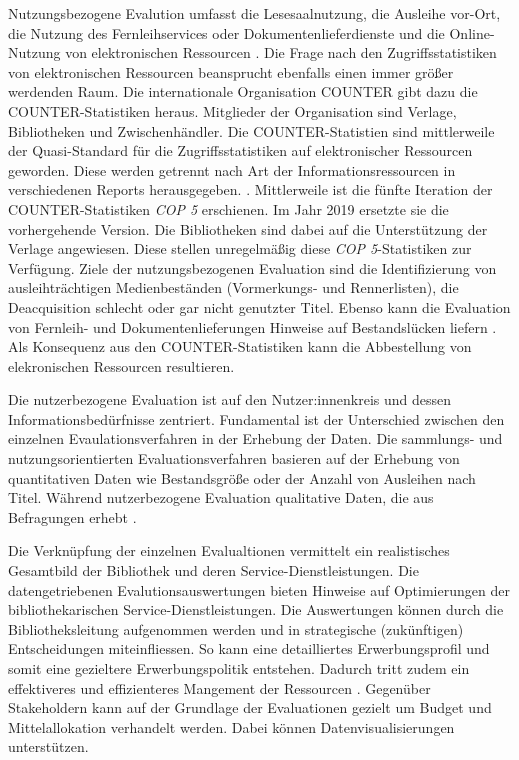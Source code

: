 Nutzungsbezogene Evalution umfasst die Lesesaalnutzung, die Ausleihe vor-Ort, die Nutzung des Fernleihservices oder Dokumentenlieferdienste und die Online-Nutzung von elektronischen Ressourcen \cite[vgl.][254 ff.]{johannsen_jochen_bestands-_2015}.
Die Frage nach den Zugriffsstatistiken von elektronischen Ressourcen beansprucht ebenfalls einen immer größer werdenden Raum.
Die internationale Organisation \acrfull{COUNTER} gibt dazu die COUNTER-Statistiken heraus. Mitglieder der Organisation sind Verlage, Bibliotheken
und Zwischenhändler. Die COUNTER-Statistien sind mittlerweile der Quasi-Standard für die Zugriffsstatistiken 
auf elektronischer Ressourcen geworden. Diese werden getrennt nach Art der Informationsressourcen in verschiedenen Reports herausgegeben. \cite[vgl.][260 ff.]{johannsen_jochen_bestands-_2015}. Mittlerweile ist die fünfte Iteration der COUNTER-Statistiken \textit{\acrshort{COP 5}} erschienen. Im Jahr 2019 ersetzte sie die
vorhergehende Version. Die Bibliotheken sind dabei auf die Unterstützung der Verlage angewiesen. Diese stellen unregelmäßig diese \textit{\acrshort{COP 5}}-Statistiken zur
Verfügung. Ziele der nutzungsbezogenen Evaluation sind die Identifizierung von ausleihträchtigen Medienbeständen (Vormerkungs- und Rennerlisten), 
die Deacquisition schlecht oder gar nicht genutzter Titel. Ebenso kann die Evaluation von Fernleih- und Dokumentenlieferungen Hinweise auf Bestandslücken liefern
\cite[vgl.][255 ff.]{johannsen_jochen_bestands-_2015}. Als Konsequenz aus den COUNTER-Statistiken kann die Abbestellung von elekronischen Ressourcen resultieren.

Die nutzerbezogene Evaluation ist auf den Nutzer:innenkreis und dessen Informationsbedürfnisse zentriert.
Fundamental ist der Unterschied zwischen den einzelnen Evaulationsverfahren in der Erhebung der Daten. 
Die sammlungs- und nutzungsorientierten Evaluationsverfahren basieren auf der Erhebung von quantitativen Daten wie Bestandsgröße oder der Anzahl von Ausleihen nach Titel. 
Während nutzerbezogene Evaluation qualitative Daten, die aus Befragungen erhebt \cite[vgl.][461 ff.]{blake_data_2004}.

Die Verknüpfung der einzelnen Evalualtionen vermittelt ein realistisches Gesamtbild der Bibliothek und deren Service-Dienstleistungen. Die datengetriebenen Evalutionsauswertungen bieten Hinweise auf Optimierungen der bibliothekarischen Service-Dienstleistungen. Die Auswertungen können durch die Bibliotheksleitung aufgenommen werden und in strategische (zukünftigen) Entscheidungen miteinfliessen. So kann eine detailliertes Erwerbungsprofil und somit eine gezieltere Erwerbungspolitik entstehen. Dadurch tritt zudem ein effektiveres und effizienteres Mangement der Ressourcen \cite[vgl.][297]{johnson_peggy_fundamentals_2014}. Gegenüber Stakeholdern kann auf der Grundlage der Evaluationen gezielt um Budget und Mittelallokation verhandelt werden. Dabei können Datenvisualisierungen unterstützen.



